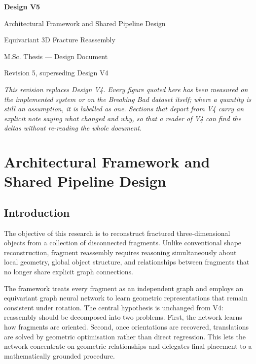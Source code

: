 \documentclass[11pt,a4paper]{report}
\begin{document}
\begin{titlepage}
\centering
\vspace*{4cm}
{\Huge\bfseries Design V5\par}
\vspace{0.8cm}
{\Large Architectural Framework and Shared Pipeline Design\par}
\vspace{0.4cm}
{\large Equivariant 3D Fracture Reassembly\par}
\vspace{2.5cm}
{\large M.Sc. Thesis --- Design Document\par}
\vspace{0.3cm}
{\normalsize Revision 5, superseding Design V4\par}
\vfill
\begin{minipage}{0.85\textwidth}
\small
\textit{This revision replaces Design V4. Every figure quoted here has been
measured on the implemented system or on the Breaking Bad dataset itself;
where a quantity is still an assumption, it is labelled as one. Sections that
depart from V4 carry an explicit note saying what changed and why, so that a
reader of V4 can find the deltas without re-reading the whole document.}
\end{minipage}
\vspace{2cm}
\end{titlepage}

\tableofcontents
\newpage

\chapter{Architectural Framework and Shared Pipeline Design}

\section{Introduction}
\label{sec:intro}

The objective of this research is to reconstruct fractured three-dimensional
objects from a collection of disconnected fragments. Unlike conventional shape
reconstruction, fragment reassembly requires reasoning simultaneously about
local geometry, global object structure, and relationships between fragments
that no longer share explicit graph connections.

The framework treats every fragment as an independent graph and employs an
equivariant graph neural network to learn geometric representations that remain
consistent under rotation. The central hypothesis is unchanged from V4:
reassembly should be decomposed into two problems. First, the network learns how
fragments are oriented. Second, once orientations are recovered, translations are
solved by geometric optimisation rather than direct regression. This lets the
network concentrate on geometric relationships and delegates final placement to a
mathematically grounded procedure.
\end{document}
